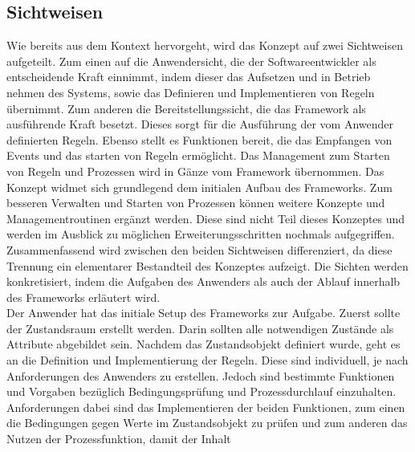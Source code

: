     \subsection{Sichtweisen}
    \label{subsec:sichtweisen}
        Wie bereits aus dem Kontext hervorgeht, wird das Konzept auf zwei Sichtweisen aufgeteilt. Zum einen auf die 
        Anwendersicht, die der Softwareentwickler als entscheidende Kraft einnimmt, indem dieser das Aufsetzen und in 
        Betrieb nehmen des Systems, sowie das Definieren und Implementieren von Regeln übernimmt. Zum anderen die 
        Bereitstellungssicht, die das Framework als ausführende Kraft besetzt. Dieses sorgt für die Ausführung der vom 
        Anwender definierten Regeln. Ebenso stellt es Funktionen bereit, die das Empfangen von Events und das starten 
        von Regeln ermöglicht. Das Management zum Starten von Regeln und Prozessen wird in Gänze vom Framework übernommen. 
        Das Konzept widmet sich grundlegend dem initialen Aufbau des Frameworks. Zum besseren Verwalten und Starten von 
        Prozessen können weitere Konzepte und Managementroutinen ergänzt werden. Diese sind nicht Teil dieses Konzeptes und 
        werden im Ausblick zu möglichen Erweiterungsschritten nochmals aufgegriffen.
        \\
        \linebreak
        Zusammenfassend wird zwischen den beiden Sichtweisen differenziert, da diese Trennung ein elementarer Bestandteil des Konzeptes 
        aufzeigt. Die Sichten werden konkretisiert, indem die Aufgaben des Anwenders als auch der Ablauf innerhalb des Frameworks 
        erläutert wird.
        \\
        \linebreak
        Der Anwender hat das initiale Setup des Frameworks zur Aufgabe. Zuerst sollte der Zustandsraum erstellt werden. 
        Darin sollten alle notwendigen Zustände als Attribute abgebildet sein. Nachdem das Zustandsobjekt 
        definiert wurde, geht es an die Definition und Implementierung der Regeln. Diese sind individuell, je nach 
        Anforderungen des Anwenders zu erstellen. Jedoch sind bestimmte Funktionen und Vorgaben bezüglich Bedingungsprüfung 
        und Prozessdurchlauf einzuhalten. Anforderungen dabei sind das Implementieren der beiden Funktionen, zum einen die 
        Bedingungen gegen Werte im Zustandsobjekt zu prüfen und zum anderen das Nutzen der Prozessfunktion, damit der Inhalt 
